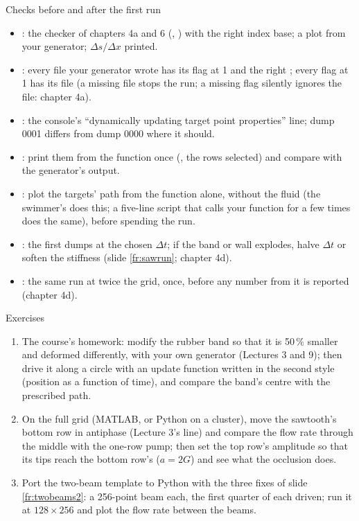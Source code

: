 \documentclass[aspectratio=169,11pt]{beamer}
\begin{document}
\begin{frame}{Checks before and after the first run}
\label{fr:checks}
\small
\begin{itemize}
  \item {}: the checker of chapters 4a and 6 (, ) with the right index base; a plot from your generator; $\Delta s/\Delta x$ printed.
  \item {}: every file your generator wrote has its flag at 1 and the right ; every flag at 1 has its file (a missing file stops the run; a missing flag silently ignores the file: chapter 4a).
  \item {}: the console's ``dynamically updating target point properties'' line; dump 0001 differs from dump 0000 where it should.
  \item {}: print them from the function once (, the rows selected) and compare with the generator's output.
  \item {}: plot the targets' path from the function alone, without the fluid (the swimmer's  does this; a five-line script that calls your function for a few times does the same), before spending the run.
  \item {}: the first dumps at the chosen $\Delta t$; if the band or wall explodes, halve $\Delta t$ or soften the stiffness (slide \ref{fr:sawrun}; chapter 4d).
  \item {}: the same run at twice the grid, once, before any number from it is reported (chapter 4d).
\end{itemize}
\end{frame}

\begin{frame}{Exercises}
\label{fr:exercises}
\small
\begin{enumerate}
  \item The course's homework: modify the rubber band so that it is 50\,\% smaller and deformed differently, with your own generator (Lectures 3 and 9); then drive it along a circle with an update function written in the second style (position as a function of time), and compare the band's centre with the prescribed path.
  \item On the full grid (MATLAB, or Python on a cluster), move the sawtooth's bottom row in antiphase (Lecture 3's line) and compare the flow rate through the middle with the one-row pump; then set the top row's amplitude so that its tips reach the bottom row's ($a = 2G$) and see what the occlusion does.
  \item Port the two-beam template to Python with the three fixes of slide \ref{fr:twobeams2}: a 256-point beam each, the first quarter of each driven; run it at $128 \times 256$ and plot the flow rate between the beams.
\end{enumerate}
\end{frame}
\end{document}
